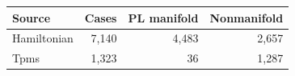 \begin{tabular}{lrrr}\toprule
Source & Cases & PL manifold & Nonmanifold \\ \midrule
Hamiltonian & 7,140 & 4,483 & 2,657 \\
Tpms & 1,323 & 36 & 1,287 \\
\bottomrule\end{tabular}